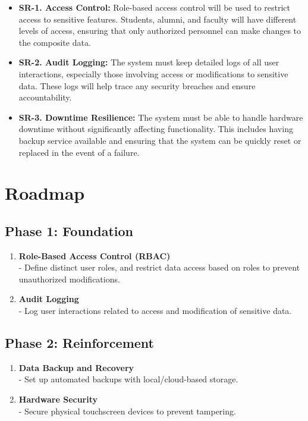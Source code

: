 \documentclass{article}
\begin{document}
\begin{itemize}
  \item \textbf{SR-1. Access Control:} Role-based access control will be used to restrict access to sensitive features. Students, alumni, and faculty will have different levels of access, ensuring that only authorized personnel can make changes to the composite data.

  \item \textbf{SR-2. Audit Logging:} The system must keep detailed logs of all user interactions, especially those involving access or modifications to sensitive data. These logs will help trace any security breaches and ensure accountability.

  \item \textbf{SR-3. Downtime Resilience:} The system must be able to handle hardware downtime without significantly affecting functionality. This includes having backup service available and ensuring that the system can be quickly reset or replaced in the event of a failure.
\end{itemize}


\section{Roadmap}

\subsection*{Phase 1: Foundation}
\begin{enumerate}
  \item \textbf{Role-Based Access Control (RBAC)} \\
  \hspace*{1em} - Define distinct user roles, and restrict data access based on roles to prevent unauthorized modifications.
  \item \textbf{Audit Logging} \\
  \hspace*{1em} - Log user interactions related to access and modification of sensitive data.
\end{enumerate}

\subsection*{Phase 2: Reinforcement}
\begin{enumerate}
  \item \textbf{Data Backup and Recovery} \\
  \hspace*{1em} - Set up automated backups with local/cloud-based storage.
  \item \textbf{Hardware Security} \\
  \hspace*{1em} - Secure physical touchscreen devices to prevent tampering.
\end{enumerate}
\end{document}
